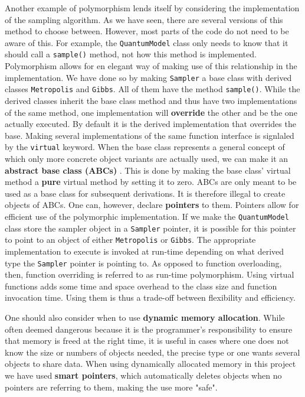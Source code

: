\documentclass[twoside,english]{uiofysmaster}
\begin{document}
Another example of polymorphism lends itself by considering the implementation of the sampling algorithm. As we have seen, there are several versions of this method to choose between. However, most parts of the code do not need to be aware of this. For example, the \texttt{QuantumModel} class only needs to know that it should call a \texttt{sample()} method, not how this method is implemented. Polymorphism allows for en elegant way of making use of this relationship in the implementation. We have done so by making \texttt{Sampler} a base class with derived classes \texttt{Metropolis} and \texttt{Gibbs}. All of them have the method \texttt{sample()}. While the derived classes inherit the base class method and thus have two implementations of the same method, one implementation will \textbf{override} the other and be the one actually executed. By default it is the derived implementation that overrides the base. Making several implementations of the same function interface is signlaled by the \texttt{virtual} keyword. 
When the base class represents a general concept of which only more concrete object variants are actually used, we can make it an \textbf{abstract base class (ABCs)} \cite{Lippman2013}. This is done by making the base class' virtual method a \textbf{pure} virtual method by setting it to zero. ABCs are only meant to be used as a base class for subsequent derivations. It is therefore illegal to create objects of ABCs. One can, however, declare \textbf{pointers} to them.
Pointers allow for efficient use of the polymorphic implementation. If we make the \texttt{QuantumModel} class store the sampler object in a \texttt{Sampler} pointer, it is possible for this pointer to point to an object of either \texttt{Metropolis} or \texttt{Gibbs}. The appropriate implementation to execute is invoked at run-time depending on what derived type the \texttt{Sampler} pointer is pointing to. As opposed to function overloading, then, function overriding is referred to as run-time polymorphism. Using virtual functions adds some time and space overhead to the class size and function invocation time. Using them is thus a trade-off between flexibility and efficiency. 

One should also consider when to use \textbf{dynamic memory allocation}. While often deemed dangerous because it is the programmer's responsibility to ensure that memory is freed at the right time, it is useful in cases where one does not know the size or numbers of objects needed, the precise type or one wants several objects to share data. When using dynamically allocated memory in this project we have used \textbf{smart pointers}, which automatically deletes objects when no pointers are referring to them, making the use more "safe".
\end{document}
